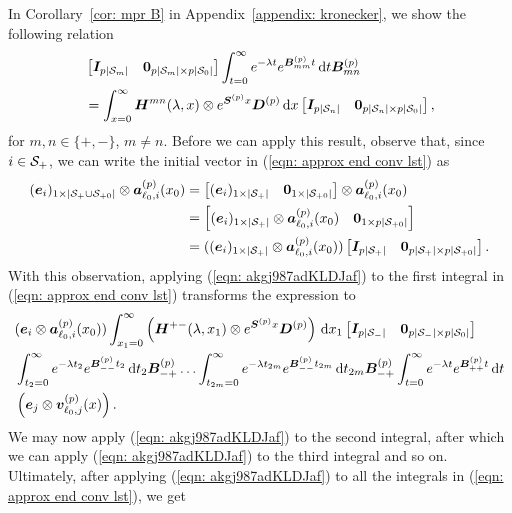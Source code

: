 In Corollary~\ref{cor: mpr B} in Appendix~\ref{appendix: kronecker}, we show the following relation
\begin{align}
	&\begin{bmatrix} \boldsymbol I_{p|\mathcal{S}_m|} & \boldsymbol 0_{p|\mathcal{S}_m|\times p|\mathcal{S}_0|}  \end{bmatrix}\int_{t=0}^\infty e^{-\lambda t} e^{\boldsymbol{B}^{(p)}_{mm}t} \, \mathrm{d} t \boldsymbol{B}^{(p)}_{m{n}} \nonumber 
	\\&= \int_{x=0}^\infty \boldsymbol H^{mn}(\lambda,x)  \otimes  e^{\boldsymbol S^{(p)} x}\boldsymbol D^{(p)}\, \mathrm{d} x \begin{bmatrix} \boldsymbol I_{p|\mathcal{S}_n|} & \boldsymbol 0_{p|\mathcal{S}_n|\times p|\mathcal{S}_0|} \end{bmatrix}, \label{eqn: akgj987adKLDJaf}
\end{align}
for \(m,n\in\{+,-\}\), \(m\neq n\). Before we can apply this result, observe that, since \(i\in\mathcal{S}_+\), we can write the initial vector in (\ref{eqn: approx end conv lst}) as 
\begin{align}
	(\boldsymbol e_i)_{1\times |\mathcal{S}_+\cup\mathcal{S}_{+0}|}\otimes \boldsymbol  a_{\ell_0,i}^{(p)}(x_0) &= 
	\begin{bmatrix} (\boldsymbol e_i)_{1\times |\mathcal{S}_+|} & \boldsymbol 0_{1\times |\mathcal{S}_{+0}|} \end{bmatrix} \otimes \boldsymbol  a_{\ell_0,i}^{(p)}(x_0) \nonumber 
	\\&= \begin{bmatrix} (\boldsymbol e_i)_{1\times |\mathcal{S}_+|}\otimes \boldsymbol  a_{\ell_0,i}^{(p)}(x_0)  & \boldsymbol 0_{1\times p|\mathcal{S}_{+0}|} \end{bmatrix} \nonumber 
	\\&= ((\boldsymbol e_i)_{1\times |\mathcal{S}_+|}\otimes \boldsymbol  a_{\ell_0,i}^{(p)}(x_0))\begin{bmatrix} \boldsymbol I_{p|\mathcal{S}_+|} & \boldsymbol 0_{p|\mathcal{S}_+|\times p|\mathcal{S}_{+0}|} \end{bmatrix}.
\end{align}
With this observation, applying (\ref{eqn: akgj987adKLDJaf}) to the first integral in (\ref{eqn: approx end conv lst}) transforms the expression to 
\begin{align}
	&(\boldsymbol e_i\otimes \boldsymbol  a_{\ell_0,i}^{(p)}(x_0)) \int_{x_1=0}^\infty \left(\boldsymbol H^{+{-}}(\lambda,x_1) \otimes e^{\boldsymbol S^{(p)} x}\boldsymbol D^{(p)}\right) \, \mathrm{d} x_1 \begin{bmatrix} \boldsymbol I_{p|\mathcal{S}_-|} & \boldsymbol 0_{p|\mathcal{S}_-|\times p|\mathcal{S}_0|} \end{bmatrix} \nonumber
	\\&\int_{t_2=0}^\infty e^{-\lambda t_2} e^{\boldsymbol{B}^{(p)}_{--}t_2} \, \mathrm{d} t_2\boldsymbol{B}^{(p)}_{-{+}} 
	\hdots 
	\int_{t_{2m}=0}^\infty e^{-\lambda t_{2m}}e^{\boldsymbol{B}^{(p)}_{--}t_{2m}} \, \mathrm{d} t_{2m}\boldsymbol{B}^{(p)}_{-{+}} 
	\int_{t=0}^\infty e^{-\lambda t}e^{\boldsymbol{B}^{(p)}_{++}t} \, \mathrm{d} t \nonumber
	\\&\left(\boldsymbol e_j \otimes {\boldsymbol v}_{\ell_0,j}^{(p)}( x)\right). \label{eqn: approx end conv lst2}
\end{align}
We may now apply (\ref{eqn: akgj987adKLDJaf}) to the second integral, after which we can apply (\ref{eqn: akgj987adKLDJaf}) to the third integral and so on. Ultimately, after applying (\ref{eqn: akgj987adKLDJaf}) to all the integrals in (\ref{eqn: approx end conv lst}), we get 
